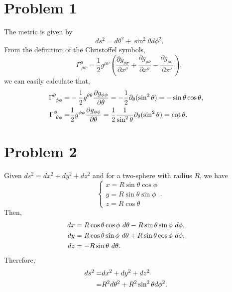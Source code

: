 \documentclass{article}
\begin{document}
\section*{Problem 1}
The metric is given by 
\begin{equation}
    ds^2 = d\theta^2 +\sin^2\theta d\phi^2.
\end{equation}
From the definition of the Christoffel symbols,
\begin{equation}
    \Gamma^\mu_{~\rho \sigma} = \frac{1}{2} g^{\mu \nu}
    \left(
        \frac{\partial g_{\nu \sigma}}{\partial x^\rho}
        +\frac{\partial g_{\rho \nu}}{\partial x^\sigma}
        -\frac{\partial g_{\rho \sigma}}{\partial x^\nu}
    \right),
\end{equation}
we can easily calculate that,
\begin{align}
    \Gamma^\theta_{~\phi \phi} =& -\frac{1}{2} g^{\theta \theta} 
    \frac{\partial g_{\phi \phi}}{\partial \theta}
    = -\frac{1}{2}\partial_\theta(\sin^2\theta)
    = -\sin \theta \cos \theta, \cr
    \Gamma^\phi_{~\theta \phi} = & \frac{1}{2} g^{\phi \phi} 
    \frac{\partial g_{\phi \phi}}{\partial \theta}
    = \frac{1}{2}\frac{1}{\sin^2\theta}\partial_\theta(\sin^2\theta)
    = \cot \theta.
\end{align}



\section*{Problem 2}
Given $ds^2 = dx^2 + dy^2 + dz^2$ and for a two-sphere with radius $R$,
we have
\begin{equation}
    \begin{cases}
        x = R \sin \theta \cos \phi\\
        y = R \sin \theta \sin \phi\\
        z = R \cos \theta
    \end{cases}.
\end{equation}
Then,
\begin{align}
    dx &= R \cos \theta \cos \phi ~d \theta - R \sin \theta \sin\phi ~d \phi,\cr
    dy &= R \cos \theta \sin \phi ~d \theta + R \sin \theta \cos \phi ~d \phi, \cr
    dz &= - R \sin \theta ~d \theta.
\end{align}
Therefore,
\begin{align}
    ds^2 =& dx^2 + dy^2 + dz^2\cr
    =& R^2 d\theta^2 + R^2 \sin^2 \theta d\phi^2.
\end{align}
\end{document}
